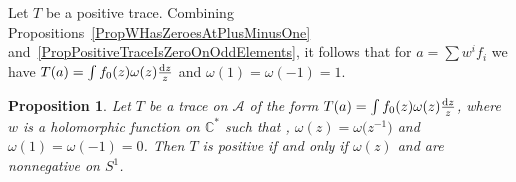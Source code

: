 \documentclass[pdftex]{sigma}
\newcommand\CC{\mathbb{C}}
\newcommand{\mc}{\mathcal}
\numberwithin{equation}{section}
\newtheorem{Proposition}[Theorem]{Proposition}
\theoremstyle{definition}
\begin{document}
 Let $T$ be a positive trace. Combining Propositions~\ref{PropWHasZeroesAtPlusMinusOne} and~\ref{PropPositiveTraceIsZeroOnOddElements}, it follows that for $a=\sum w^i f_i$ we have $T(a)=\int f_0(z)\omega(z)\frac{{\rm d}z}{z}$ and $\omega(1)=\omega(-1)=1$. %
\begin{Proposition}
\label{PropPositivityForW}
 Let $T$ be a trace on $\mc{A}$ of the form $T(a)=\int f_0(z)\omega(z)\frac{{\rm d}z}{z}$, where $w$ is a holomorphic function on $\CC^*$ such that , $\omega(z)=\omega\bigl(z^{-1}\bigr)$ and $\omega(1)=\omega(-1)=0$. Then $T$ is positive if and only if $\omega(z)$ and  are nonnegative on $S^1$.
\end{Proposition}
\end{document}

